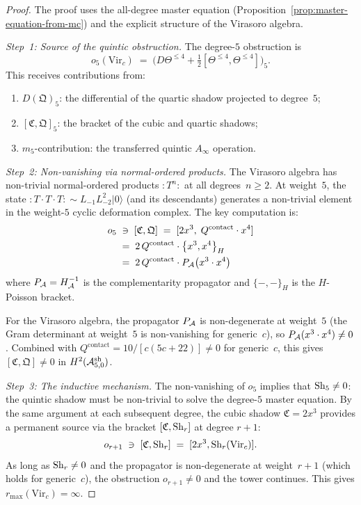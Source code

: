 \begin{proof}
The proof uses the all-degree master equation
(Proposition~\ref{prop:master-equation-from-mc}) and the explicit
structure of the Virasoro algebra.

\medskip\noindent
\emph{Step~1: Source of the quintic obstruction.}\;
The degree-$5$ obstruction is
\begin{equation}\label{eq:thqg-VI-quintic-obstruction-formula}
o_5(\mathrm{Vir}_c)
\;=\;
\bigl(D\Theta^{\leq 4} + \tfrac{1}{2}
[\Theta^{\leq 4}, \Theta^{\leq 4}]\bigr)_5.
\end{equation}
This receives contributions from:
\begin{enumerate}[label=\textup{(\alph*)}]
\item $D(\mathfrak{Q})_5$: the differential of the quartic
 shadow projected to degree~$5$;
\item $[\mathfrak{C}, \mathfrak{Q}]_5$: the bracket of the cubic
 and quartic shadows;
\item $m_5$-contribution: the transferred quintic $A_\infty$
 operation.
\end{enumerate}

\medskip\noindent
\emph{Step~2: Non-vanishing via normal-ordered products.}\;
The Virasoro algebra has non-trivial normal-ordered products
$:T^n:$ at all degrees~$n \geq 2$. At weight~$5$, the state
$:T\cdot T\cdot T: \sim L_{-1}L_{-2}^2|0\rangle$ (and
its descendants) generates a non-trivial element in the
weight-$5$ cyclic deformation complex. The key computation is:
\begin{align}
o_5 &\;\ni\;
[\mathfrak{C}, \mathfrak{Q}]
\;=\;
[2x^3,\; Q^{\mathrm{contact}}\cdot x^4]
\notag \\
&\;=\;
2\,Q^{\mathrm{contact}}\cdot
\bigl\{x^3, x^4\bigr\}_H
\notag \\
&\;=\;
2\,Q^{\mathrm{contact}}\cdot
P_{\mathcal{A}}\bigl(x^3 \cdot x^4\bigr)
\label{eq:thqg-VI-quintic-bracket}
\end{align}
where $P_{\mathcal{A}} = H_{\mathcal{A}}^{-1}$ is the complementarity propagator and
$\{-, -\}_H$ is the $H$-Poisson bracket.

For the Virasoro algebra, the propagator $P_{\mathcal{A}}$ is non-degenerate
at weight~$5$ (the Gram determinant at weight~$5$ is non-vanishing
for generic~$c$), so
$P_{\mathcal{A}}(x^3 \cdot x^4) \neq 0$.
Combined with $Q^{\mathrm{contact}} = 10/[c(5c+22)] \neq 0$
for generic~$c$, this gives
$[\mathfrak{C}, \mathfrak{Q}] \neq 0$
in $H^2(\mathcal{A}^{\mathrm{sh}}_{5,0})$.

\medskip\noindent
\emph{Step~3: The inductive mechanism.}\;
The non-vanishing of $o_5$ implies that $\operatorname{Sh}_5 \neq 0$: the
quintic shadow must be non-trivial to solve the degree-$5$ master
equation. By the same argument at each subsequent degree, the
cubic shadow $\mathfrak{C} = 2x^3$ provides a permanent source
via the bracket $[\mathfrak{C}, \operatorname{Sh}_r]$ at degree $r+1$:
\[
o_{r+1} \;\ni\;
[\mathfrak{C}, \operatorname{Sh}_r]
\;=\;
[2x^3, \operatorname{Sh}_r(\mathrm{Vir}_c)].
\]
As long as $\operatorname{Sh}_r \neq 0$ and the propagator is non-degenerate
at weight~$r+1$ (which holds for generic~$c$), the obstruction
$o_{r+1} \neq 0$ and the tower continues. This gives
$r_{\max}(\mathrm{Vir}_c) = \infty$.
\end{proof}

